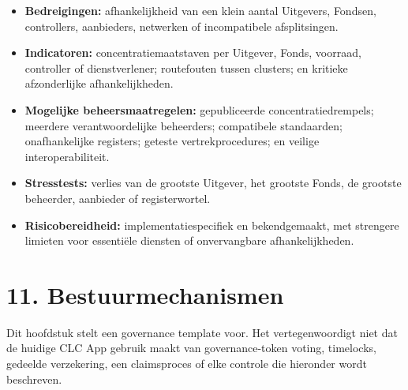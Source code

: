 \documentclass[11pt]{article}
\begin{document}
\begin{itemize}[leftmargin=*]
\item \textbf{Bedreigingen:} afhankelijkheid van een klein aantal Uitgevers, Fondsen, controllers, aanbieders, netwerken of incompatibele afsplitsingen.
\item \textbf{Indicatoren:} concentratiemaatstaven per Uitgever, Fonds, voorraad, controller of dienstverlener; routefouten tussen clusters; en kritieke afzonderlijke afhankelijkheden.
\item \textbf{Mogelijke beheersmaatregelen:} gepubliceerde concentratiedrempels; meerdere verantwoordelijke beheerders; compatibele standaarden; onafhankelijke registers; geteste vertrekprocedures; en veilige interoperabiliteit.
\item \textbf{Stresstests:} verlies van de grootste Uitgever, het grootste Fonds, de grootste beheerder, aanbieder of registerwortel.
\item \textbf{Risicobereidheid:} implementatiespecifiek en bekendgemaakt, met strengere limieten voor essentiële diensten of onvervangbare afhankelijkheden.
\end{itemize}

\section*{11. Bestuurmechanismen}

Dit hoofdstuk stelt een governance template voor. Het vertegenwoordigt niet dat de huidige CLC App gebruik maakt van governance-token voting, timelocks, gedeelde verzekering, een claimsproces of elke controle die hieronder wordt beschreven.
\end{document}

